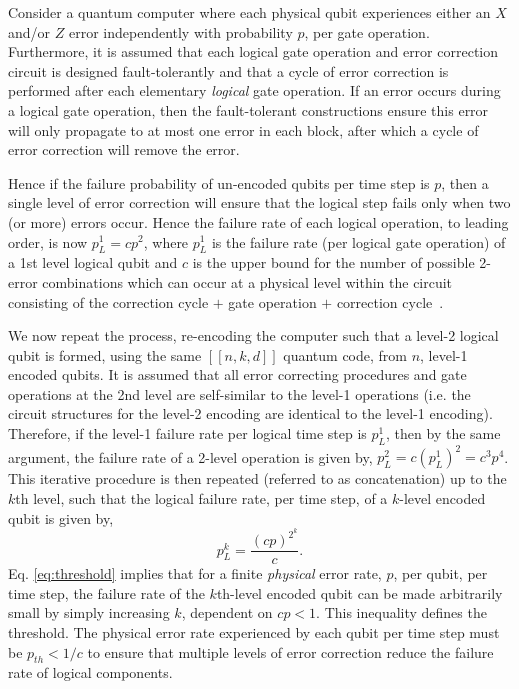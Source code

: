 Consider a quantum computer where each physical 
qubit experiences either an $X$ and/or $Z$ error independently 
with probability $p$, per gate operation.  
Furthermore, it is assumed that each logical gate operation and error 
correction circuit is designed fault-tolerantly and that a cycle of 
error correction is performed after each elementary {\em logical} gate operation.  If an error occurs 
during a logical gate operation, then the fault-tolerant constructions ensure this error will only propagate 
to at most one error in each block, after which a cycle of error correction will remove the error.  

Hence if the failure probability of un-encoded qubits per time step is $p$, then a single level 
of error correction will ensure that the logical step fails only when two (or more) errors occur.  Hence 
the failure rate of each logical operation, to leading order, is now $p^1_L = cp^2$, where $p^1_L$ is the 
failure rate (per logical gate operation) of a 1st level logical qubit and $c$ is the upper bound for the 
number of possible 2-error combinations 
which can occur at a physical level within the circuit consisting of the 
correction cycle $+$ gate operation $+$ 
correction cycle~\cite{bib:A07}.  

We now repeat the process, re-encoding the computer 
such that a level-2 logical qubit is formed, using the same $[[n,k,d]]$ 
quantum code, from $n$, level-1 encoded 
qubits.  It is assumed that all error correcting procedures and gate operations at the 2nd level are 
self-similar to the level-1 operations (i.e. the circuit structures for the level-2 encoding are 
identical to the level-1 encoding).  Therefore, if the level-1 failure rate per logical time step is $p^1_L$, 
then by the same argument, the failure rate of a 2-level operation is given by,
$p^2_L = c(p^1_L)^2 = c^3p^4$.  This iterative procedure is then repeated (referred to as concatenation) 
up to the $k$th level, such that the logical failure rate, per time step, of a $k$-level encoded qubit is given by,
\begin{equation}
p^k_L = \frac{(cp)^{2^k}}{c}.
\label{eq:threshold}
\end{equation}   
Eq. \ref{eq:threshold} implies that for a finite {\em physical} error rate, $p$, per qubit, per time step, 
the failure rate of the $k$th-level encoded qubit can be made arbitrarily small by simply increasing $k$,  
dependent on $cp < 1$.  This inequality defines the threshold.  The physical error rate 
experienced by each qubit per time step must be $p_{th} < 1/c$ to ensure that multiple levels of 
error correction reduce the failure rate of logical components.


